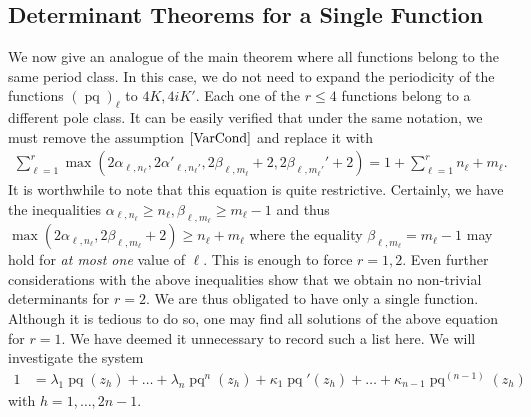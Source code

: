 \documentclass{amsart}
\theoremstyle{definition}
\DeclareMathOperator{\pq}{pq}
\begin{document}
\subsection{Determinant Theorems for a Single Function} 
We now give an analogue of the main theorem where all functions belong to the same period class. In this case, we do not need to expand the periodicity of the functions $(\pq)_\ell$ to $4K, 4iK'$. Each one of the $r\le 4$ functions belong to a different pole class. It can be easily verified that under the same notation, we must remove the assumption $\eqref{VarCond}$ and replace it with
\begin{align*}
    \sum_{\ell=1}^r \max\left(2\alpha_ {\ell,n_\ell},2\alpha'_{\ell,n_\ell'},2\beta_{\ell,m_\ell}+2,2\beta_{\ell,m_\ell'}'+2  \right)=1+\sum_{\ell=1}^r n_\ell+m_\ell.
\end{align*}
It is worthwhile to note that this equation is quite restrictive. Certainly, we have the inequalities $\alpha_{\ell,n_\ell}\ge n_\ell, \beta_{\ell,m_\ell}\ge  m_\ell -1$ and thus $\max(2\alpha_{\ell,n_\ell},2\beta_{\ell,m_\ell}+2)\ge n_\ell+m_\ell$ where the equality $\beta_{\ell,m_\ell}=m_\ell -1$ may hold for \textit{at most one} value of $\ell$. This is enough to force $r=1,2$. Even further considerations with the above inequalities show that we obtain no non-trivial determinants for $r=2$. We are thus obligated to have only a single function. Although it is tedious to do so, one may find all solutions of the above equation for $r=1$. We have deemed it unnecessary to record such a list here. We will investigate the system
\begin{align*}
        1&=\lambda_{1}\pq(z_h)+\ldots+\lambda_{n}\pq^{n}(z_h)+\kappa_{1}\pq'(z_h)+\ldots+\kappa_{n-1}\pq^{(n-1)}(z_h)
\end{align*}
with $h=1,\ldots,2n-1$.
\end{document}
